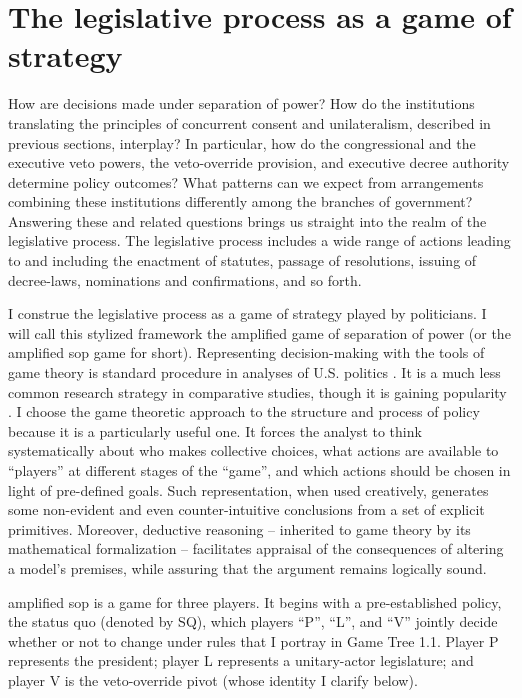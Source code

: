 \section{The legislative process as a game of strategy}

How are decisions made under separation of power?  How do the institutions translating the principles of concurrent consent and unilateralism, described in previous sections, interplay?  In particular, how do the congressional and the executive veto powers, the veto-override provision, and executive decree authority determine policy outcomes?  What patterns can we expect from arrangements combining these institutions differently among the branches of government?  Answering these and related questions brings us straight into the realm of the legislative process.  The legislative process includes a wide range of actions leading to and including the enactment of statutes, passage of resolutions, issuing of decree-laws, nominations and confirmations, and so forth.  

I construe the legislative process as a game of strategy played by politicians.  I will call this stylized framework the amplified game of separation of power (or the amplified sop game for short).  Representing decision-making with the tools of game theory is standard procedure in analyses of U.S. politics \citep[eg.][]{shepsle.1979,ingberman.yao.1991,krehbiel.1996,cox.1999,mccarty.2000,cameron.2000}.  It is a much less common research strategy in comparative studies, though it is gaining popularity \citep[eg.][]{huber.1996a,cox.1997,diermeier.feddersen.1998,baron.ferejohn.1989,londregan.2000a}.  I choose the game theoretic approach to the structure and process of policy because it is a particularly useful one.  It forces the analyst to think systematically about who makes collective choices, what actions are available to “players” at different stages of the “game”, and which actions should be chosen in light of pre-defined goals.  Such representation, when used creatively, generates some non-evident and even counter-intuitive conclusions from a set of explicit primitives.  Moreover, deductive reasoning – inherited to game theory by its mathematical formalization – facilitates appraisal of the consequences of altering a model’s premises, while assuring that the argument remains logically sound.  

amplified sop is a game for three players.  It begins with a pre-established policy, the status quo (denoted by SQ), which players “P”, “L”, and “V” jointly decide whether or not to change under rules that I portray in Game Tree 1.1.  Player P represents the president; player L represents a unitary-actor legislature; and player V is the veto-override pivot (whose identity I clarify below).  

